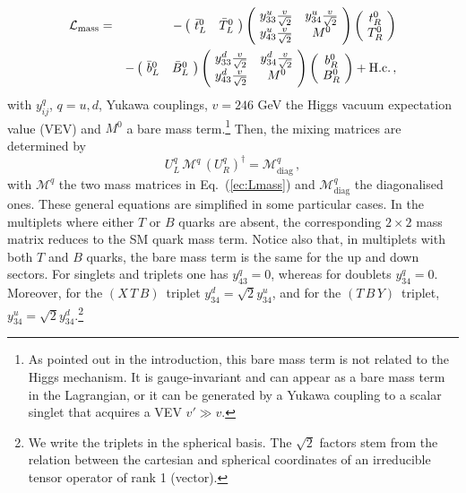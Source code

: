\documentclass[12pt,a4paper]{article}
\newcommand{\xtb}{$(X\,T\,B)$}
\newcommand{\tby}{$(T\,B\,Y)$}
\begin{document}
\begin{eqnarray}
\mathcal{L}_\text{mass} & = & - \left(\! \begin{array}{cc} \bar t_L^0 & \bar T_L^0 \end{array} \!\right)
\left(\! \begin{array}{cc} y_{33}^u \frac{v}{\sqrt 2} & y_{34}^u \frac{v}{\sqrt 2} \\ y_{43}^u \frac{v}{\sqrt 2} & M^0 \end{array} \!\right)
\left(\! \begin{array}{c} t^0_R \\ T^0_R \end{array}
\!\right) \notag \\
& & - \left(\! \begin{array}{cc} \bar b_L^0 & \bar B_L^0 \end{array} \!\right)
\left(\! \begin{array}{cc} y_{33}^d \frac{v}{\sqrt 2} & y_{34}^d \frac{v}{\sqrt 2} \\ y_{43}^d \frac{v}{\sqrt 2} & M^0 \end{array} \!\right)
\left(\! \begin{array}{c} b^0_R \\ B^0_R \end{array}
\!\right) +\text{H.c.} \,,
\label{ec:Lmass}
\end{eqnarray}
with $y_{ij}^q$, $q=u,d$, Yukawa couplings, $v=246$ GeV the Higgs vacuum expectation value (VEV) and $M^0$ a bare mass
term.\footnote{As pointed out in the introduction, this bare mass term is not related to the Higgs mechanism. It is gauge-invariant and can appear as a bare mass term in the Lagrangian, or it can be generated by a Yukawa coupling to a scalar singlet that acquires a VEV $v' \gg v$.} Then, the mixing matrices are determined by
\begin{equation}
U_L^q \, \mathcal{M}^q \, (U_R^q)^\dagger = \mathcal{M}^q_\text{diag} \,, 
\label{ec:diag}
\end{equation}
with $\mathcal{M}^q$ the two mass matrices in Eq.~(\ref{ec:Lmass}) and $\mathcal{M}^q_\text{diag}$ the diagonalised ones. These general equations are simplified in some particular cases. In the multiplets where either $T$ or $B$ quarks are absent, the corresponding $2 \times 2$ mass matrix reduces to the SM quark mass term. Notice also that, in multiplets with both $T$ and $B$ quarks, the bare mass term is the same for the up and down sectors. For singlets and triplets one has $y_{43}^q = 0$, whereas for doublets $y_{34}^q=0$. Moreover, for the \xtb\ triplet $y_{34}^d = \sqrt 2 y_{34}^u$, and for the \tby\ triplet, $y_{34}^u = \sqrt 2 y_{34}^d$.\footnote{We write the triplets in the spherical basis. The $\sqrt 2$ factors stem from the relation between the cartesian and spherical coordinates of an irreducible tensor operator of rank 1 (vector).}
\end{document}
